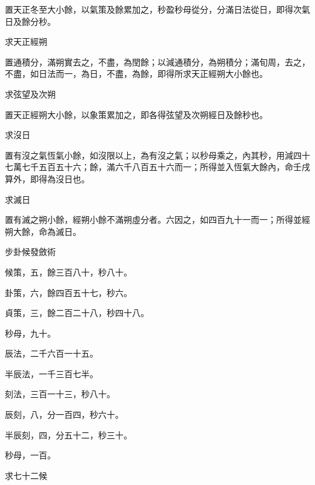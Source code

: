 \begin{pinyinscope}
 置天正冬至大小餘，以氣策及餘累加之，秒盈秒母從分，分滿日法從日，即得次氣日及餘分秒。



 求天正經朔



 置通積分，滿朔實去之，不盡，為閏餘；以減通積分，為朔積分；滿旬周，去之，不盡，如日法而一，為日，不盡，為餘，即得所求天正經朔大小餘也。



 求弦望及次朔



 置天正經朔大小餘，以象策累加之，即各得弦望及次朔經日及餘秒也。



 求沒日



 置有沒之氣恆氣小餘，如沒限以上，為有沒之氣；以秒母乘之，內其秒，用減四十七萬七千五百五十六；餘，滿六千八百五十六而一；所得並入恆氣大餘內，命壬戌算外，即得為沒日也。



 求滅日



 置有滅之朔小餘，經朔小餘不滿朔虛分者。六因之，如四百九十一而一；所得並經朔大餘，命為滅日。



 步卦候發斂術



 候策，五，餘三百八十，秒八十。



 卦策，六，餘四百五十七，秒六。



 貞策，三，餘二百二十八，秒四十八。



 秒母，九十。



 辰法，二千六百一十五。



 半辰法，一千三百七半。



 刻法，三百一十三，秒八十。



 辰刻，八，分一百四，秒六十。



 半辰刻，四，分五十二，秒三十。



 秒母，一百。



 求七十二候




\end{pinyinscope}
